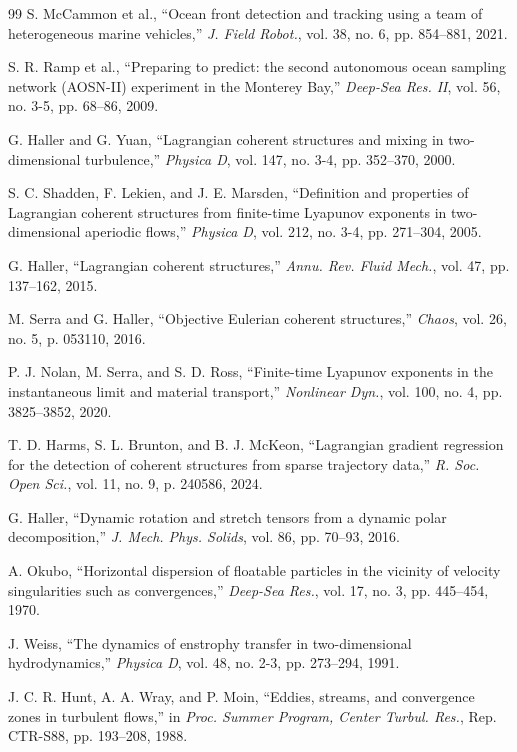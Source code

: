 \documentclass[lettersize,journal]{IEEEtran}
\begin{document}
\begin{thebibliography}{99}
 S. McCammon et al., ``Ocean front detection and tracking using a
team of heterogeneous marine vehicles,'' \textit{J. Field Robot.}, vol. 38,
no. 6, pp. 854--881, 2021.

 S. R. Ramp et al., ``Preparing to predict: the second autonomous
ocean sampling network (AOSN-II) experiment in the Monterey Bay,''
\textit{Deep-Sea Res. II}, vol. 56, no. 3-5, pp. 68--86, 2009.

 G. Haller and G. Yuan, ``Lagrangian coherent structures and mixing
in two-dimensional turbulence,'' \textit{Physica D}, vol. 147, no. 3-4,
pp. 352--370, 2000.

 S. C. Shadden, F. Lekien, and J. E. Marsden, ``Definition and
properties of Lagrangian coherent structures from finite-time Lyapunov
exponents in two-dimensional aperiodic flows,'' \textit{Physica D}, vol. 212,
no. 3-4, pp. 271--304, 2005.

 G. Haller, ``Lagrangian coherent structures,'' \textit{Annu. Rev.
Fluid Mech.}, vol. 47, pp. 137--162, 2015.

 M. Serra and G. Haller, ``Objective Eulerian coherent
structures,'' \textit{Chaos}, vol. 26, no. 5, p. 053110, 2016.

 P. J. Nolan, M. Serra, and S. D. Ross, ``Finite-time Lyapunov
exponents in the instantaneous limit and material transport,''
\textit{Nonlinear Dyn.}, vol. 100, no. 4, pp. 3825--3852, 2020.

 T. D. Harms, S. L. Brunton, and B. J. McKeon, ``Lagrangian
gradient regression for the detection of coherent structures from sparse
trajectory data,'' \textit{R. Soc. Open Sci.}, vol. 11, no. 9,
p. 240586, 2024.

 G. Haller, ``Dynamic rotation and stretch tensors from a
dynamic polar decomposition,'' \textit{J. Mech. Phys. Solids}, vol. 86,
pp. 70--93, 2016.

 A. Okubo, ``Horizontal dispersion of floatable particles in the
vicinity of velocity singularities such as convergences,'' \textit{Deep-Sea
Res.}, vol. 17, no. 3, pp. 445--454, 1970.

 J. Weiss, ``The dynamics of enstrophy transfer in two-dimensional
hydrodynamics,'' \textit{Physica D}, vol. 48, no. 2-3, pp. 273--294, 1991.

 J. C. R. Hunt, A. A. Wray, and P. Moin, ``Eddies, streams, and
convergence zones in turbulent flows,'' in \textit{Proc. Summer Program,
Center Turbul. Res.}, Rep. CTR-S88, pp. 193--208, 1988.


\end{thebibliography}
\end{document}
